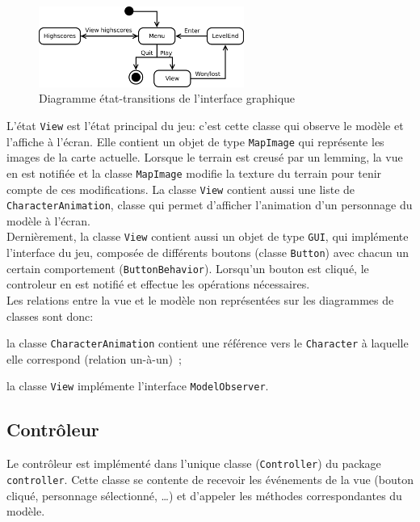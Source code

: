 \documentclass[a4paper,12pt]{article}
\begin{document}
\begin{figure}[ht!]
  \centerline{
  \includegraphics[width=0.6\textwidth]{state.png}}
  \caption{Diagramme état-transitions de l'interface graphique}
  \label{fig:Etats}
\end{figure}

L'état \texttt{View} est l'état principal du jeu: c'est cette classe
qui observe le modèle et l'affiche à l'écran. Elle contient un objet
de type \texttt{MapImage} qui représente les images de la carte
actuelle. Lorsque le terrain est creusé par un lemming, la vue en est
notifiée et la classe \texttt{MapImage} modifie la texture du terrain
pour tenir compte de ces modifications. La classe \texttt{View}
contient aussi une liste de \texttt{CharacterAnimation}, classe qui
permet d'afficher l'animation d'un personnage du modèle à l'écran.\\

Dernièrement, la classe \texttt{View} contient aussi un objet de type
\texttt{GUI}, qui implémente l'interface du jeu, composée de
différents boutons (classe \texttt{Button}) avec chacun un certain
comportement (\texttt{ButtonBehavior}). Lorsqu'un bouton est cliqué,
le controleur en est notifié et effectue les opérations nécessaires.\\

Les relations entre la vue et le modèle non représentées sur les
diagrammes de classes sont donc:
\begin{list}{-}{}
  \item la classe \texttt{CharacterAnimation} contient une référence
    vers le \texttt{Character} à laquelle elle correspond (relation
    un-à-un)~;
  \item la classe \texttt{View} implémente l'interface
    \texttt{ModelObserver}.
\end{list}

\subsection{Contrôleur}
Le contrôleur est implémenté dans l'unique classe
(\texttt{Controller}) du package \texttt{controller}. Cette
classe se contente de recevoir les événements de la vue
(bouton cliqué, personnage sélectionné, \dots) et d'appeler
les méthodes correspondantes du modèle.
\end{document}
